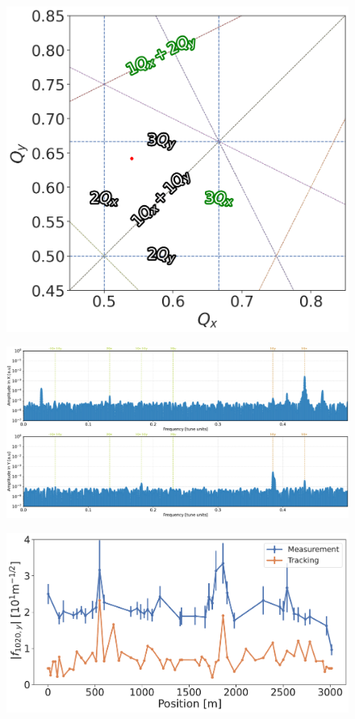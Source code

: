 \FloatBarrier
\subsection{}

\begin{figure}[!htb]
    \centering
    \includegraphics[width=0.6\linewidth]{images/kek/tune_diagram.png}
    \caption{}
    \label{fig:kek:tune_diagram}
\end{figure}

\begin{figure}[!htb]
    \centering
    \includegraphics[width=\linewidth]{images/kek/HER_2024-02-06_sextupoles_spectrum.pdf}
    \caption{}
    \label{fig:kek:rdt_spectrum_HER}
\end{figure}

\begin{figure}[!htb]
    \centering
    \includegraphics[width=0.8\linewidth]{images/kek/f1020y_HER.pdf}
    \caption{}
    \label{fig:kek:rdt_f1020y_HER}
\end{figure}

